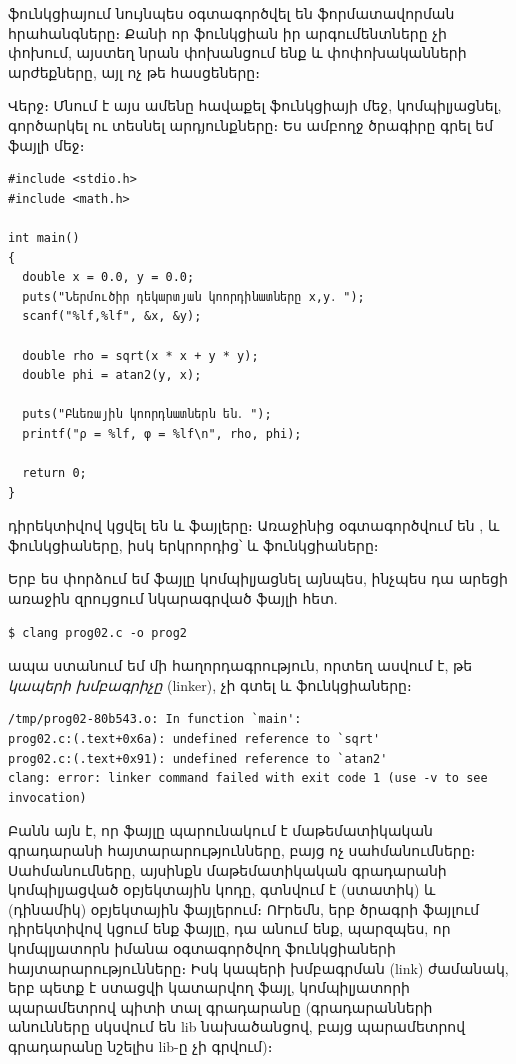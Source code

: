  ֆունկցիայում նույնպես օգտագործվել են 
ֆորմատավորման հրահանգները։ Քանի որ  ֆունկցիան իր
արգումենտները չի փոխում, այստեղ նրան փոխանցում ենք  և
 փոփոխականների արժեքները, այլ ոչ թե հասցեները։

Վերջ։ Մնում է այս ամենը հավաքել  ֆունկցիայի մեջ,
կոմպիլյացնել, գործարկել ու տեսնել արդյունքները։ Ես ամբողջ ծրագիրը գրել
եմ  ֆայլի մեջ։

\begin{Verbatim}
#include <stdio.h>
#include <math.h>

int main()
{
  double x = 0.0, y = 0.0;
  puts("Ներմուծիր դեկարտյան կոորդինատները x,y․ ");
  scanf("%lf,%lf", &x, &y);

  double rho = sqrt(x * x + y * y);
  double phi = atan2(y, x);

  puts("Բևեռային կոորդնատներն են․ ");
  printf("ρ = %lf, φ = %lf\n", rho, phi);

  return 0;
}
\end{Verbatim}

 դիրեկտիվով կցվել են  և
 ֆայլերը։ Առաջինից օգտագործվում են ,
 և  ֆունկցիաները, իսկ երկրորդից՝
 և  ֆունկցիաները։

Երբ ես փորձում եմ  ֆայլը կոմպիլյացնել այնպես, ինչպես դա
արեցի առաջին զրույցում նկարագրված  ֆայլի հետ.

\begin{verbatim}
$ clang prog02.c -o prog2
\end{verbatim}

ապա ստանում եմ մի հաղորդագրություն, որտեղ ասվում է, թե
\emph{կապերի խմբագրիչը} (linker), չի գտել  և 
ֆունկցիաները։

\begin{verbatim}
/tmp/prog02-80b543.o: In function `main':
prog02.c:(.text+0x6a): undefined reference to `sqrt'
prog02.c:(.text+0x91): undefined reference to `atan2'
clang: error: linker command failed with exit code 1 (use -v to see invocation)
\end{verbatim}

Բանն այն է, որ  ֆայլը պարունակում է մաթեմատիկական
գրադարանի հայտարարությունները, բայց ոչ սահմանումները։ Սահմանումները,
այսինքն մաթեմատիկական գրադարանի կոմպիլյացված օբյեկտային կոդը, գտնվում է
 (ստատիկ) և  (դինամիկ) օբյեկտային
ֆայլերում։ ՈՒրեմն, երբ ծրագրի ֆայլում  դիրեկտիվով
կցում ենք  ֆայլը, դա անում ենք, պարզպես, որ կոմպլյատորն
իմանա օգտագործվող ֆունկցիաների հայտարարությունները։ Իսկ կապերի խմբագրման
(link) ժամանակ, երբ պետք է ստացվի կատարվող ֆայլ, կոմպիլյատորի
 պարամետրով պիտի տալ  գրադարանը (գրադարանների
անունները սկսվում են lib նախածանցով, բայց  պարամետրով
գրադարանը նշելիս lib-ը չի գրվում)։

